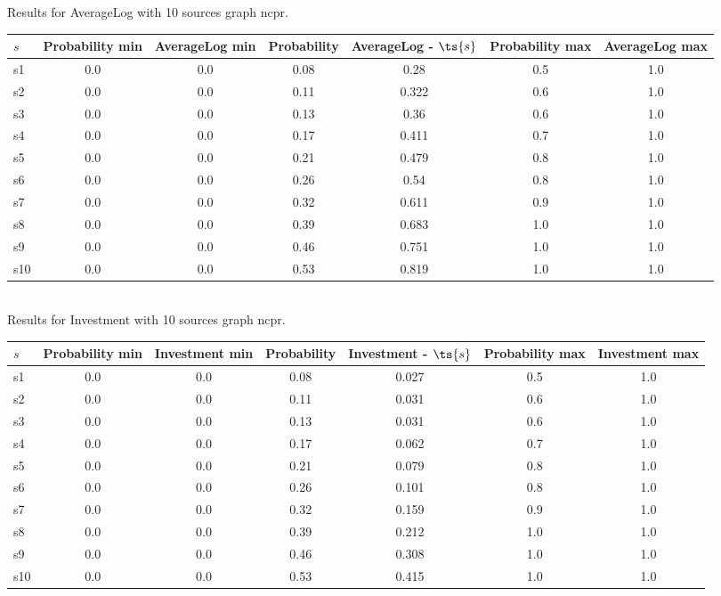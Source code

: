 \documentclass{article}
\begin{document}
\noindent Results for AverageLog with 10 sources graph ncpr.

\noindent\begin{tabular}{|l|c|c|c|c|c|c|}
\hline
$s$& Probability min & AverageLog min & Probability & AverageLog - $\ts{s}$ & Probability max & AverageLog max\\
\hline
s1 &0.0 & 0.0 & 0.08 & 0.28 & 0.5 & 1.0\\
\hline
s2 &0.0 & 0.0 & 0.11 & 0.322 & 0.6 & 1.0\\
\hline
s3 &0.0 & 0.0 & 0.13 & 0.36 & 0.6 & 1.0\\
\hline
s4 &0.0 & 0.0 & 0.17 & 0.411 & 0.7 & 1.0\\
\hline
s5 &0.0 & 0.0 & 0.21 & 0.479 & 0.8 & 1.0\\
\hline
s6 &0.0 & 0.0 & 0.26 & 0.54 & 0.8 & 1.0\\
\hline
s7 &0.0 & 0.0 & 0.32 & 0.611 & 0.9 & 1.0\\
\hline
s8 &0.0 & 0.0 & 0.39 & 0.683 & 1.0 & 1.0\\
\hline
s9 &0.0 & 0.0 & 0.46 & 0.751 & 1.0 & 1.0\\
\hline
s10 &0.0 & 0.0 & 0.53 & 0.819 & 1.0 & 1.0\\
\hline
\end{tabular}\\

\noindent Results for Investment with 10 sources graph ncpr.

\noindent\begin{tabular}{|l|c|c|c|c|c|c|}
\hline
$s$& Probability min & Investment min & Probability & Investment - $\ts{s}$ & Probability max & Investment max\\
\hline
s1 &0.0 & 0.0 & 0.08 & 0.027 & 0.5 & 1.0\\
\hline
s2 &0.0 & 0.0 & 0.11 & 0.031 & 0.6 & 1.0\\
\hline
s3 &0.0 & 0.0 & 0.13 & 0.031 & 0.6 & 1.0\\
\hline
s4 &0.0 & 0.0 & 0.17 & 0.062 & 0.7 & 1.0\\
\hline
s5 &0.0 & 0.0 & 0.21 & 0.079 & 0.8 & 1.0\\
\hline
s6 &0.0 & 0.0 & 0.26 & 0.101 & 0.8 & 1.0\\
\hline
s7 &0.0 & 0.0 & 0.32 & 0.159 & 0.9 & 1.0\\
\hline
s8 &0.0 & 0.0 & 0.39 & 0.212 & 1.0 & 1.0\\
\hline
s9 &0.0 & 0.0 & 0.46 & 0.308 & 1.0 & 1.0\\
\hline
s10 &0.0 & 0.0 & 0.53 & 0.415 & 1.0 & 1.0\\
\hline
\end{tabular}\\
\end{document}
